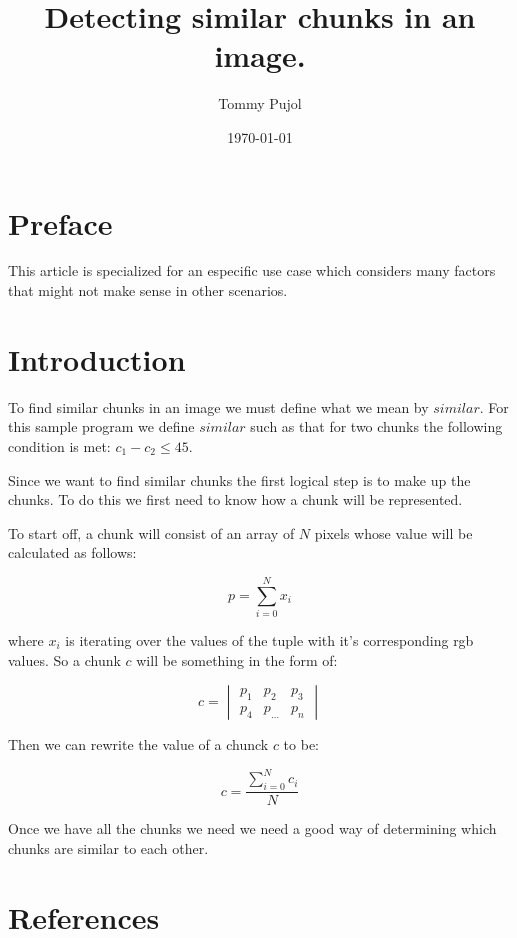 \documentclass{article}
\title{Detecting similar chunks in an image.}
\author{Tommy Pujol}
\date{\today}
\begin{document}
\maketitle

\section{Preface}

This article is specialized for an especific use case which considers many factors
that might not make sense in other scenarios.


\section{Introduction}

To find similar chunks in an image we must define what we mean by $similar$. For
this sample program we define $similar$ such as that for two chunks the following
condition is met: $c_1 - c_2 \leq 45$.

Since we want to find similar chunks the first logical step is to make up the chunks.
To do this we first need to know how a chunk will be represented.

To start off, a chunk will consist of an array of $N$ pixels whose value will be
calculated as follows:

\begin{equation}
	p = \sum_{i=0}^{N} x_i
\end{equation}

where $x_i$ is iterating over the values of the tuple with it's corresponding rgb
values. So a chunk $c$ will be something in the form of:

\begin{equation}
	c = \begin{vmatrix}
		p_1 & p_2 & p_3 \\
		p_4 & p_{\dots} & p_n
	\end{vmatrix}
\end{equation}

Then we can rewrite the value of a chunck $c$ to be:

\begin{equation}
	c = \frac{\sum\limits_{i=0}^{N} c_i}{N}
\end{equation}

Once we have all the chunks we need we need a good way of determining which chunks
are similar to each other.

\newpage
\section{References}
\end{document}
